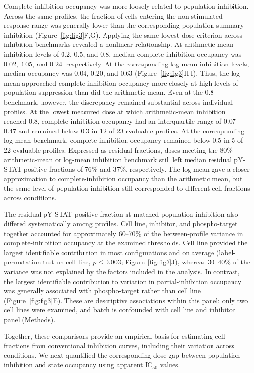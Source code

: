 \documentclass[11pt]{article}
\newcommand{\icfifty}{IC$_{50}$}
\begin{document}
Complete-inhibition occupancy was more loosely related to population inhibition. Across the same profiles, the fraction of cells entering the non-stimulated response range was generally lower than the corresponding population-summary inhibition (Figure~\ref{fig:fig3}F,G). Applying the same lowest-dose criterion across inhibition benchmarks revealed a nonlinear relationship. At arithmetic-mean inhibition levels of 0.2, 0.5, and 0.8, median complete-inhibition occupancy was 0.02, 0.05, and 0.24, respectively. At the corresponding log-mean inhibition levels, median occupancy was 0.04, 0.20, and 0.63 (Figure~\ref{fig:fig3}H,I). Thus, the log-mean approached complete-inhibition occupancy more closely at high levels of population suppression than did the arithmetic mean. Even at the 0.8 benchmark, however, the discrepancy remained substantial across individual profiles. At the lowest measured dose at which arithmetic-mean inhibition reached 0.8, complete-inhibition occupancy had an interquartile range of 0.07--0.47 and remained below 0.3 in 12 of 23 evaluable profiles. At the corresponding log-mean benchmark, complete-inhibition occupancy remained below 0.5 in 5 of 22 evaluable profiles. Expressed as residual fractions, doses meeting the 80\% arithmetic-mean or log-mean inhibition benchmark still left median residual pY-STAT-positive fractions of 76\% and 37\%, respectively. The log-mean gave a closer approximation to complete-inhibition occupancy than the arithmetic mean, but the same level of population inhibition still corresponded to different cell fractions across conditions.

The residual pY-STAT-positive fraction at matched population inhibition also differed systematically among profiles. Cell line, inhibitor, and phospho-target together accounted for approximately 60--70\% of the between-profile variance in complete-inhibition occupancy at the examined thresholds. Cell line provided the largest identifiable contribution in most configurations and on average (label-permutation test on cell line, $p \le 0.003$; Figure~\ref{fig:fig3}J), whereas 30--40\% of the variance was not explained by the factors included in the analysis. In contrast, the largest identifiable contribution to variation in partial-inhibition occupancy was generally associated with phospho-target rather than cell line (Figure~\ref{fig:fig3}E). These are descriptive associations within this panel: only two cell lines were examined, and batch is confounded with cell line and inhibitor panel (Methods).

Together, these comparisons provide an empirical basis for estimating cell fractions from conventional inhibition curves, including their variation across conditions. We next quantified the corresponding dose gap between population inhibition and state occupancy using apparent \icfifty{} values.
\end{document}
